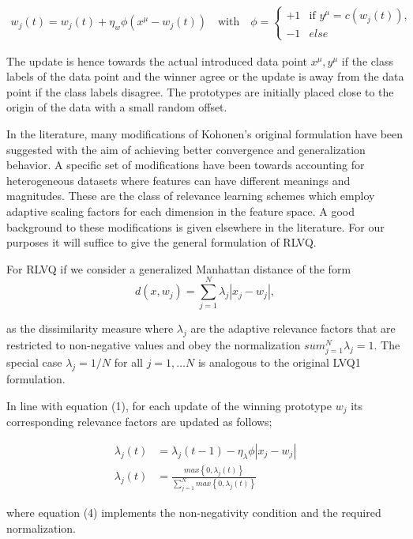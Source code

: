 \documentclass{esannV2}
\begin{document}
\begin{align} 
w_j(t) = w_j(t) + \eta_w \phi (x^\mu - w_j(t)) \quad \text{with} \quad
\phi = \begin{cases}
+1& \text{if $y^\mu = c(w_j(t))$},\\
-1& else 
\end{cases}
\end{align}

The update is hence towards the actual introduced data point ${x^\mu, y^\mu}$ if the class labels of the data point and the winner agree or the update is away from the data point if the class labels disagree. The prototypes are initially placed close to the origin of the data with a small random offset.

In the literature, many modifications of Kohonen's original formulation have been suggested with the aim of achieving better convergence and generalization behavior. A specific set of modifications have been towards accounting for heterogeneous datasets where features can have different meanings and magnitudes. These are the class of relevance learning schemes which employ adaptive scaling factors for each dimension in the feature space. A good background to these modifications is given elsewhere in the literature\cite{09,10,11}. For our purposes it will suffice to give the general formulation of RLVQ.

For RLVQ if we consider a generalized Manhattan distance of the form
\begin{equation} 
d(x,w_j) = \sum^N_{j=1} \lambda_j |x_j - w_j| ,
\end{equation}

as the dissimilarity measure where $\lambda_j$ are the adaptive relevance factors that are restricted to non-negative values and obey the normalization $sum^N_{j=1} \lambda_j = 1$. The special case $\lambda_j = 1/N$ for all $j = 1,\ldots N$ is analogous to the original LVQ1 formulation.

In line with equation (1), for each update of the winning prototype $w_j$ its corresponding relevance factors are updated as follows;

\begin{align}
\lambda_j(t) &= \lambda_j(t-1) - \eta_\lambda \phi |x_j - w_j| \\
\lambda_j(t) &= \frac{max\left\{0,\lambda_j(t)\right\}}{\sum^N_{j=1} max\left\{0,\lambda_j(t)\right\}}
\end{align}


where equation (4) implements the non-negativity condition and the required normalization.
\end{document}
